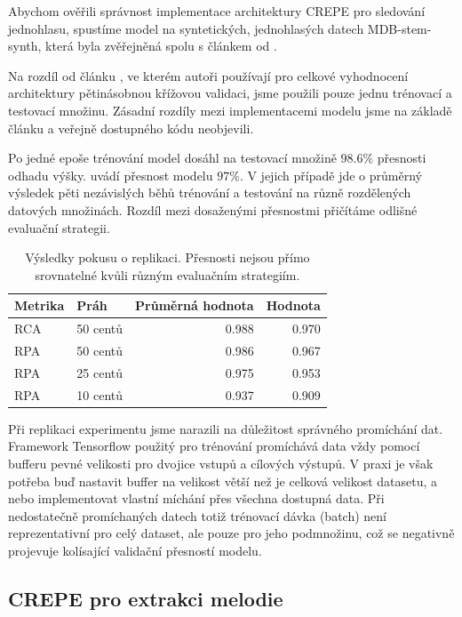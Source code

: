 Abychom ověřili správnost implementace architektury CREPE pro sledování jednohlasu, spustíme model na syntetických, jednohlasých datech MDB-stem-synth, která byla zvěřejněná spolu s článkem od \cite{Salamon2017}.

Na rozdíl od článku \cite{Kim2018}, ve kterém autoři používají pro celkové vyhodnocení architektury pětinásobnou křížovou validaci, jsme použili pouze jednu trénovací a testovací množinu. Zásadní rozdíly mezi implementacemi modelu jsme na základě článku a veřejně dostupného kódu neobjevili.

Po jedné epoše trénování model dosáhl na testovací množině $98.6\%$ přesnosti odhadu výšky. \cite{Kim2018} uvádí přesnost modelu $97\%$. V jejich případě jde o průměrný výsledek pěti nezávislých běhů trénování a testování na různě rozdělených datových množinách. Rozdíl mezi dosaženými přesnostmi přičítáme odlišné evaluační strategii.

\begin{table}[h!]

\centering
    \begin{tabular}{llrr}
    \toprule
    Metrika & Práh & Průměrná hodnota & Hodnota \cite{Kim2018} \\
    \midrule
    RCA & 50 centů & 0.988 & 0.970 \\
    RPA  & 50 centů & 0.986 & 0.967 \\
    RPA  & 25 centů & 0.975 & 0.953 \\
    RPA  & 10 centů & 0.937 & 0.909 \\
    \bottomrule
    \end{tabular}
\caption{Výsledky pokusu o replikaci. Přesnosti nejsou přímo srovnatelné kvůli různým evaluačním strategiím.}\label{tab:crepe_dimensions}

\end{table}

Při replikaci experimentu jsme narazili na důležitost správného promíchání dat. Framework Tensorflow použitý pro trénování promíchává data vždy pomocí bufferu pevné velikosti pro dvojice vstupů a cílových výstupů. V praxi je však potřeba buď nastavit buffer na velikost větší než je celková velikost datasetu, a nebo implementovat vlastní míchání přes všechna dostupná data. Při nedostatečně promíchaných datech totiž trénovací dávka (batch) není reprezentativní pro celý dataset, ale pouze pro jeho podmnožinu, což se negativně projevuje kolísající validační přesností modelu.

\subsection{CREPE pro extrakci melodie}

